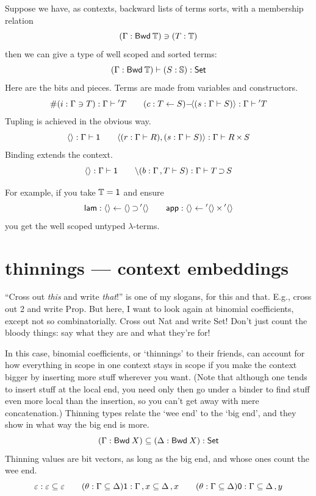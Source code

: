 \documentclass{book}
\newcommand{\D}[1]{\blue{\ensuremath{\mathsf{#1}}}}
\newcommand{\C}[1]{\red{\ensuremath{\mathsf{#1}}}}
\newcommand{\N}[1]{\black{\ensuremath{#1}}}
\newcommand{\SET}{\D{\mathsf{Set}}}
\newcommand{\vd}{\C{\langle\rangle}}
\newcommand{\pr}[2]{\red{\langle\N{#1},\N{#2}\rangle}}
\begin{document}
\newcommand{\emp}{\red{\varepsilon}}
\newcommand{\snoc}{\mathop{\red{,}}}
\newcommand{\slam}{\red{\char92}}
Suppose we have, as contexts, backward lists of terms sorts, with a membership relation
\[
(\Gamma : \Bwd{\TmS}) \vni (T : \TmS)
\]
then we can give a type of well scoped and sorted terms:
\[
(\Gamma : \Bwd{\TmS}) \tm (S:\Sort) : \SET
\]
Here are the bits and pieces. Terms are made from variables and constructors.
\[
\va{(i : \Gamma\vni T)} : \Gamma \tm \stm{T}
\qquad
\cn{(c : T\cfrom S)}{(s:\Gamma \tm S)} : \Gamma \tm \stm{T}
\]
Tupling is achieved in the obvious way.
\[
\vd:\Gamma\tm\sone \qquad
\pr{(r:\Gamma\tm R)}{(s:\Gamma\tm S)} : \Gamma\tm R\stimes S
\]
Binding extends the context.
\[
\vd:\Gamma\tm\sone \qquad
\slam(b:\Gamma\snoc T \tm S) : \Gamma\tm T\shook S
\]

For example, if you take $\TmS = \D{1}$ and ensure
\[
\C{lam}:\vd \cfrom \vd\shook\stm{\vd}
\qquad
\C{app}:\vd\cfrom\stm{\vd}\stimes\stm{\vd}
\]
you get the well scoped untyped $\lambda$-terms.


\section{thinnings --- context embeddings}

\newcommand{\thin}{\mathrel{\blue{\subseteq}}}
\newcommand{\thi}{\C{1}}
\newcommand{\tho}{\C{0}}
``Cross out \emph{this} and write \emph{that}!'' is one of my slogans, for this and that. E.g., cross out 2 and write Prop. But here, I want to look again at binomial coefficients, except not so combinatorially. Cross out Nat and write Set! Don't just count the bloody things: say what they are and what they're for!

In this case, binomial coefficients, or `thinnings' to their friends, can account for how everything in scope in one context stays in scope if you make the context bigger by inserting more stuff wherever you want. (Note that although one tends to insert stuff at the local end, you need only then go under a binder to find stuff even more local than the insertion, so you can't get away with mere concatenation.) Thinning types relate the `wee end' to the `big end', and they show in what way the big end is more.
\[
(\Gamma : \Bwd{X})\thin(\Delta : \Bwd{X}) : \SET
\]
Thinning values are bit vectors, as long as the big end, and whose ones count the wee end.
\[
\emp : \emp\thin\emp \qquad
(\theta : \Gamma\thin\Delta)\thi : \Gamma\snoc x \thin \Delta\snoc x \qquad
(\theta : \Gamma\thin\Delta)\tho : \Gamma \thin \Delta\snoc y
\]
\end{document}
